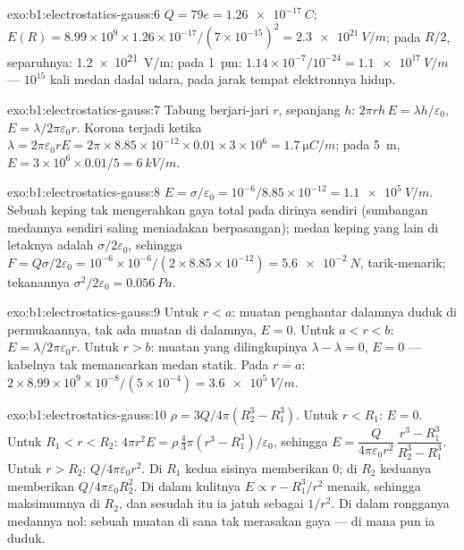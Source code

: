\begin{solution}{exo:b1:electrostatics-gauss:6}
$Q = 79e = \qty{1.26e-17}{C}$; $E(R) = 8.99 \times 10^9 \times 1.26 \times 10^{-17}/
(7 \times 10^{-15})^2 = \qty{2.3e21}{V/m}$; pada $R/2$, separuhnya: \qty{1.2e21}{V/m}; pada
\qty{1}{pm}: $1.14 \times 10^{-7}/10^{-24} = \qty{1.1e17}{V/m}$ --- $10^{15}$ kali
medan dadal udara, pada jarak tempat elektronnya hidup.
\end{solution}

\begin{solution}{exo:b1:electrostatics-gauss:7}
Tabung berjari-jari $r$, sepanjang $h$: $2\pi rh\,E = \lambda h/\varepsilon_0$, $E =
\lambda/2\pi\varepsilon_0r$. Korona terjadi ketika $\lambda = 2\pi\varepsilon_0 rE = 2\pi \times 8.85 \times
10^{-12} \times 0.01 \times 3 \times 10^6 = \qty{1.7}{\micro C/m}$; pada \qty{5}{m},
$E = 3 \times 10^6 \times 0.01/5 = \qty{6}{kV/m}$.
\end{solution}

\begin{solution}{exo:b1:electrostatics-gauss:8}
$E = \sigma/\varepsilon_0 = 10^{-6}/8.85 \times 10^{-12} = \qty{1.1e5}{V/m}$. Sebuah keping
tak mengerahkan gaya total pada dirinya sendiri (sumbangan medannya sendiri saling meniadakan
berpasangan); medan keping yang lain di letaknya adalah $\sigma/2\varepsilon_0$, sehingga
$F = Q\sigma/2\varepsilon_0 = 10^{-6} \times 10^{-6}/(2 \times 8.85 \times 10^{-12}) =
\qty{5.6e-2}{N}$, tarik-menarik; tekanannya $\sigma^2/2\varepsilon_0 = \qty{0.056}{Pa}$.
\end{solution}

\begin{solution}{exo:b1:electrostatics-gauss:9}
Untuk $r < a$: muatan penghantar dalamnya duduk di permukaannya, tak ada muatan
di dalamnya, $E = 0$. Untuk $a < r < b$: $E = \lambda/2\pi\varepsilon_0r$. Untuk $r > b$: muatan
yang dilingkupinya $\lambda - \lambda = 0$, $E = 0$ --- kabelnya tak memancarkan medan
statik. Pada $r = a$: $2 \times 8.99 \times 10^9 \times 10^{-8}/(5 \times 10^{-4}) =
\qty{3.6e5}{V/m}$.
\end{solution}

\begin{solution}{exo:b1:electrostatics-gauss:10}
$\rho = 3Q/4\pi(R_2^3 - R_1^3)$. Untuk $r < R_1$: $E = 0$. Untuk $R_1 < r < R_2$: $4\pi r^2E =
\rho\,\tfrac43\pi(r^3 - R_1^3)/\varepsilon_0$, sehingga $E = \dfrac{Q}{4\pi\varepsilon_0r^2}\,
\dfrac{r^3 - R_1^3}{R_2^3 - R_1^3}$. Untuk $r > R_2$: $Q/4\pi\varepsilon_0r^2$. Di $R_1$ kedua
sisinya memberikan $0$; di $R_2$ keduanya memberikan $Q/4\pi\varepsilon_0R_2^2$. Di dalam kulitnya $E
\propto r - R_1^3/r^2$ menaik, sehingga maksimumnya di $R_2$, dan sesudah
itu ia jatuh sebagai $1/r^2$. Di dalam rongganya medannya nol: sebuah muatan
di sana tak merasakan gaya --- di mana pun ia duduk.
\end{solution}

